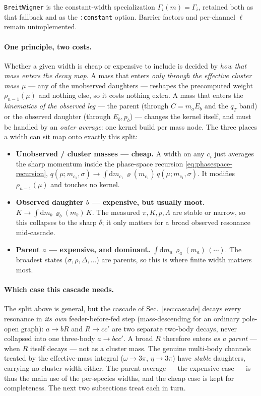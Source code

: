 \documentclass[11pt]{article}
\begin{document}
\texttt{BreitWigner} is the constant-width specialization
$\Gamma_i(m)=\Gamma_i$, retained both as that fallback and as the
\texttt{:constant} option.  Barrier factors and per-channel $\ell$ remain
unimplemented.

\paragraph{One principle, two costs.}
Whether a given width is cheap or expensive to include is decided by
\emph{how that mass enters the decay map}.  A mass that enters \emph{only
through the effective cluster mass $\mu$} --- any of the unobserved
daughters --- reshapes the precomputed weight $\rho_{n-1}(\mu)$ and nothing
else, so it costs nothing extra.  A mass that enters the \emph{kinematics of
the observed leg} --- the parent (through $C=m_aE_b$ and the $q_T$ band) or
the observed daughter (through $E_b,p_b$) --- changes the kernel itself, and
must be handled by an \emph{outer average}: one kernel build per mass node.
The three places a width can sit map onto exactly this split:
\begin{itemize}
\item \textbf{Unobserved / cluster masses --- cheap.}  A width on any $c_i$
just averages the sharp momentum inside the phase-space recursion
\eqref{eq:phasespace-recursion},
$q(\mu;m_{c_1},\sigma)\to\int\mathrm{d}m_{c_1}\,\varrho(m_{c_1})\,q(\mu;m_{c_1},\sigma)$.
It modifies $\rho_{n-1}(\mu)$ and touches no kernel.
\item \textbf{Observed daughter $b$ --- expensive, but usually moot.}
$K\to\int\mathrm{d}m_b\,\varrho_b(m_b)\,K$.  The measured $\pi,K,p,\Lambda$
are stable or narrow, so this collapses to the sharp $\delta$; it only
matters for a broad observed resonance mid-cascade.
\item \textbf{Parent $a$ --- expensive, and dominant.}
$\int\mathrm{d}m_a\,\varrho_a(m_a)\,(\cdots)$.  The broadest states
($\sigma,\rho,\Delta,\dots$) are parents, so this is where finite width
matters most.
\end{itemize}

\paragraph{Which case this cascade needs.}
The split above is general, but the cascade of Sec.~\ref{sec:cascade} decays
every resonance in \emph{its own} feeder-before-fed step (mass-descending for
an ordinary pole-open graph): $a\to bR$ and $R\to cc'$ are two separate
two-body decays, never collapsed into one three-body $a\to bcc'$.  A broad
$R$ therefore enters \emph{as a parent} --- when $R$ itself decays --- not as
a cluster mass.  The genuine multi-body channels treated by the
effective-mass integral ($\omega\to3\pi$, $\eta\to3\pi$) have \emph{stable}
daughters, carrying no cluster width either.  The parent average --- the
expensive case --- is thus the main use of the per-species widths, and the
cheap case is kept for completeness.  The next two subsections treat each in
turn.
\end{document}

